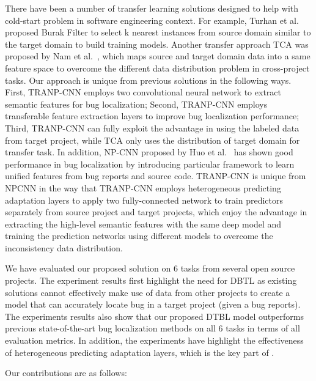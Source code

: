 There have been a number of transfer learning solutions designed to help with cold-start problem in software engineering context. For example, Turhan et al.~\cite{TurhanMBS09} proposed Burak Filter to select  k nearest instances from source domain similar to the target domain to build training models. Another transfer approach TCA was proposed by Nam et al.~\cite{Nam2013transfer}, which maps source and target domain data into a same feature space to overcome the different data distribution problem in cross-project tasks. Our approach is unique from previous solutions in the following ways. First, TRANP-CNN employs two convolutional neural network to extract semantic features for bug localization; Second, TRANP-CNN employs transferable feature extraction layers to improve bug localization performance; Third, TRANP-CNN can fully exploit the advantage in using the labeled data from target project, while TCA only uses the distribution of target domain for transfer task. In addition, NP-CNN proposed by Huo et al.~\cite{huo2016learning} has shown good performance in bug localization by introducing particular framework to learn unified features from bug reports and source code. TRANP-CNN is unique from NPCNN in the way that TRANP-CNN employs heterogeneous predicting adaptation layers to apply two fully-connected network to train predictors separately from source project and target projects, which enjoy the advantage in extracting the high-level semantic features with the same deep model and training the prediction networks using different models to overcome the inconsistency data distribution. 

We have evaluated our proposed solution on 6 tasks from several open source projects. The experiment results first highlight the need for DBTL as existing solutions cannot effectively make use of data from other projects to create a model that can accurately locate bug in a target project (given a bug reports). The experiments results also show that our proposed DTBL model \TRANPCNN outperforms previous state-of-the-art bug localization methods on all 6 tasks in terms of all evaluation metrics. In addition, the experiments have highlight the effectiveness of heterogeneous predicting adaptation layers, which is the key part of \TRANPCNN.

Our contributions are as follows:


